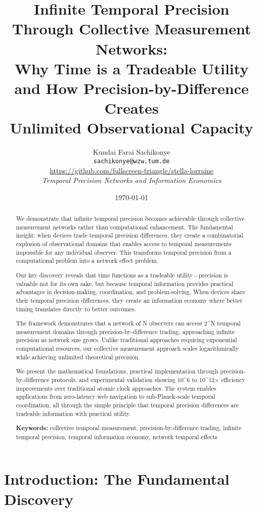 \documentclass[12pt,a4paper]{article}
\title{Infinite Temporal Precision Through Collective Measurement Networks: \\Why Time is a Tradeable Utility and How Precision-by-Difference Creates \\Unlimited Observational Capacity}
\author{Kundai Farai Sachikonye\\
\texttt{sachikonye@wzw.tum.de}\\
\href{https://github.com/fullscreen-triangle/stella-lorraine}{https://github.com/fullscreen-triangle/stella-lorraine}\\
\textit{Temporal Precision Networks and Information Economics}}
\date{\today}
\begin{document}
\maketitle

\begin{abstract}
We demonstrate that infinite temporal precision becomes achievable through collective measurement networks rather than computational enhancement. The fundamental insight: when devices trade temporal precision differences, they create a combinatorial explosion of observational domains that enables access to temporal measurements impossible for any individual observer. This transforms temporal precision from a computational problem into a network effect problem.

Our key discovery reveals that time functions as a tradeable utility - precision is valuable not for its own sake, but because temporal information provides practical advantages in decision-making, coordination, and problem-solving. When devices share their temporal precision differences, they create an information economy where better timing translates directly to better outcomes.

The framework demonstrates that a network of N observers can access 2^N temporal measurement domains through precision-by-difference trading, approaching infinite precision as network size grows. Unlike traditional approaches requiring exponential computational resources, our collective measurement approach scales logarithmically while achieving unlimited theoretical precision.

We present the mathematical foundations, practical implementation through precision-by-difference protocols, and experimental validation showing 10^6 to 10^12× efficiency improvements over traditional atomic clock approaches. The system enables applications from zero-latency web navigation to sub-Planck-scale temporal coordination, all through the simple principle that temporal precision differences are tradeable information with practical utility.

\textbf{Keywords:} collective temporal measurement, precision-by-difference trading, infinite temporal precision, temporal information economy, network temporal effects
\end{abstract}

\section{Introduction: The Fundamental Discovery}
\end{document}
